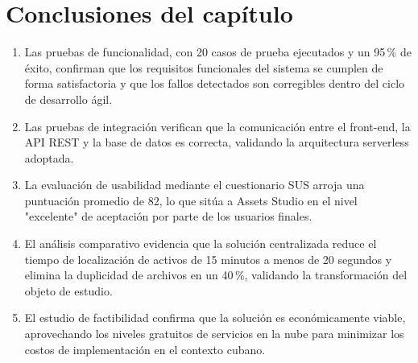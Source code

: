 \section*{Conclusiones del capítulo}

\begin{enumerate}
    \item Las pruebas de funcionalidad, con 20 casos de prueba ejecutados y un 95\,\% de éxito, confirman que los requisitos funcionales del sistema se cumplen de forma satisfactoria y que los fallos detectados son corregibles dentro del ciclo de desarrollo ágil.
    \item Las pruebas de integración verifican que la comunicación entre el front-end, la API REST y la base de datos es correcta, validando la arquitectura serverless adoptada.
    \item La evaluación de usabilidad mediante el cuestionario SUS arroja una puntuación promedio de 82, lo que sitúa a Assets Studio en el nivel "excelente" de aceptación por parte de los usuarios finales.
    \item El análisis comparativo evidencia que la solución centralizada reduce el tiempo de localización de activos de 15 minutos a menos de 20 segundos y elimina la duplicidad de archivos en un 40\,\%, validando la transformación del objeto de estudio.
    \item El estudio de factibilidad confirma que la solución es económicamente viable, aprovechando los niveles gratuitos de servicios en la nube para minimizar los costos de implementación en el contexto cubano.
\end{enumerate}